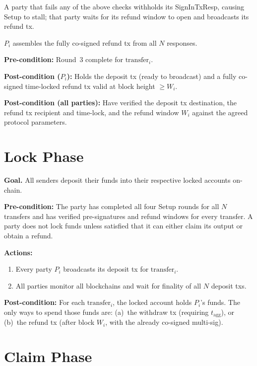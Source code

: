 \documentclass[11pt,a4paper,dvipsnames]{article}
\newcommand{\msg}[1]{\textsf{#1}}
\newcommand{\tagg}{t_{\mathrm{agg}}}
\begin{document}
A party that fails any of the above checks withholds its
\msg{SignInTxResp}, causing Setup to stall; that party waits for its refund
window to open and broadcasts its refund tx.

$P_i$ assembles the fully co-signed refund tx from all $N$ responses.

\noindent\textbf{Pre-condition:} Round~3 complete for $\mathrm{transfer}_i$.

\noindent\textbf{Post-condition ($P_i$):} Holds the deposit tx (ready to
broadcast) and a fully co-signed time-locked refund tx valid at block height
$\geq W_i$.

\noindent\textbf{Post-condition (all parties):} Have verified the deposit tx
destination, the refund tx recipient and time-lock, and the refund window
$W_i$ against the agreed protocol parameters.

\section{Lock Phase}
\label{sec:lock}

\textbf{Goal.}\;
All senders deposit their funds into their respective locked accounts
on-chain.

\textbf{Pre-condition:}
The party has completed all four Setup rounds for all $N$ transfers and has
verified pre-signatures and refund windows for every transfer.
A party does not lock funds unless satisfied that it can either claim its
output or obtain a refund.

\noindent\textbf{Actions:}
\begin{enumerate}
  \item Every party $P_i$ broadcasts its deposit tx for $\mathrm{transfer}_i$.
  \item All parties monitor all blockchains and wait for finality of all $N$
    deposit txs.
\end{enumerate}

\noindent\textbf{Post-condition:}
For each $\mathrm{transfer}_i$, the locked account holds $P_i$'s funds.
The only ways to spend those funds are:
(a)~the withdraw tx (requiring $\tagg$), or
(b)~the refund tx (after block $W_i$, with the already co-signed multi-sig).

\section{Claim Phase}
\label{sec:claim}
\end{document}

